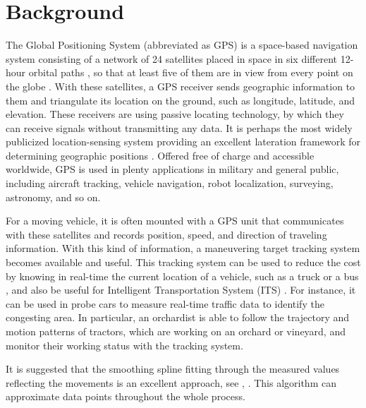 

\section{Background}


The Global Positioning System (abbreviated as GPS) is a space-based navigation system consisting of a network of 24 satellites placed in space in six different 12-hour orbital paths \cite{agrawal2015introduction}, so that at least five of them are in view from every point on the globe \cite{kaplan2005understanding} \cite{bajaj2002gps}. With these satellites, a GPS receiver sends geographic information to them and triangulate its location on the ground, such as longitude, latitude, and elevation. These receivers are using passive locating technology, by which they can receive signals without transmitting any data. It is perhaps the most widely publicized location-sensing system providing an excellent lateration framework for determining geographic positions \cite{hightower2001location}. Offered free of charge and accessible worldwide, GPS is used in plenty applications in military and general public, including aircraft tracking, vehicle navigation, robot localization, surveying, astronomy, and so on. 

For a moving vehicle, it is often mounted with a GPS unit that communicates with these satellites and records position, speed, and direction of traveling information. With this kind of information, a maneuvering target tracking system becomes available and useful. This tracking system can be used to reduce the cost by knowing in real-time the current location of a vehicle, such as a truck or a bus \cite{chadil2008real}, and also be useful for Intelligent Transportation System (ITS) \cite{mcdonald2006intelligent}. For instance, it can be used in probe cars to measure real-time traffic data to identify the congesting area. In particular, an orchardist is able to follow the trajectory and motion patterns of tractors, which are working on an orchard or vineyard, and monitor their working status with the tracking system. 



It is suggested that the smoothing spline fitting through the measured values reflecting the movements is an excellent approach, see \cite{eubank2004simple}, \cite{durbin2012time}. This algorithm can approximate data points throughout the whole process. 


